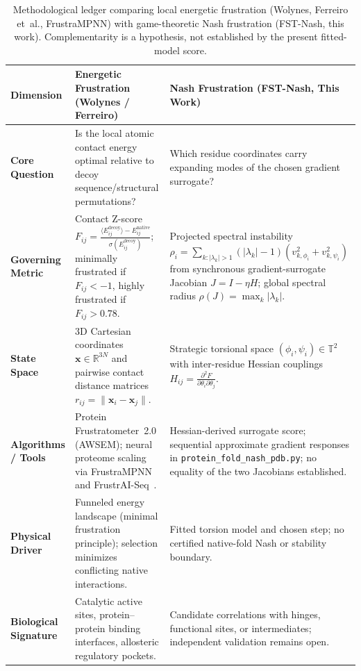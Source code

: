 \documentclass[12pt,a4paper]{article}
\theoremstyle{remark}
\begin{document}
\begin{table}[htbp]
\centering
\caption{Methodological ledger comparing local energetic frustration (Wolynes, Ferreiro et~al., FrustraMPNN) with game-theoretic Nash frustration (FST-Nash, this work). Complementarity is a hypothesis, not established by the present fitted-model score.}
\label{tab:frustration-comparison}
\small
\begin{tabularx}{\textwidth}{@{}L{0.20\textwidth} L{0.37\textwidth} Y@{}}
\toprule
\textbf{Dimension} & \textbf{Energetic Frustration (Wolynes / Ferreiro)} & \textbf{Nash Frustration (FST-Nash, This Work)} \\
\midrule
\textbf{Core Question} & Is the local atomic contact energy optimal relative to decoy sequence/structural permutations? & Which residue coordinates carry expanding modes of the chosen gradient surrogate? \\
\addlinespace
\textbf{Governing Metric} & Contact Z-score $F_{ij} = \frac{\langle E_{ij}^{\text{decoy}} \rangle - E_{ij}^{\text{native}}}{\sigma(E_{ij}^{\text{decoy}})}$; minimally frustrated if $F_{ij} < -1$, highly frustrated if $F_{ij} > 0.78$. & Projected spectral instability $\rho_i = \sum_{k: |\lambda_k|>1} (|\lambda_k|-1)(v_{k,\phi_i}^2 + v_{k,\psi_i}^2)$ from synchronous gradient-surrogate Jacobian $J = I - \eta H$; global spectral radius $\rho(J) = \max_k |\lambda_k|$. \\
\addlinespace
\textbf{State Space} & 3D Cartesian coordinates $\mathbf{x} \in \mathbb{R}^{3N}$ and pairwise contact distance matrices $r_{ij} = \|\mathbf{x}_i - \mathbf{x}_j\|$. & Strategic torsional space $(\phi_i, \psi_i) \in \mathbb{T}^2$ with inter-residue Hessian couplings $H_{ij} = \frac{\partial^2 F}{\partial \theta_i \partial \theta_j}$. \\
\addlinespace
\textbf{Algorithms / Tools} & Protein Frustratometer~2.0 (AWSEM); neural proteome scaling via FrustraMPNN and FrustrAI-Seq~\citep{Beining2026,Leusch2026}. & Hessian-derived surrogate score; sequential approximate gradient responses in \texttt{protein\_fold\_nash\_pdb.py}; no equality of the two Jacobians established. \\
\addlinespace
\textbf{Physical Driver} & Funneled energy landscape (minimal frustration principle); selection minimizes conflicting native interactions. & Fitted torsion model and chosen step; no certified native-fold Nash or stability boundary. \\
\addlinespace
\textbf{Biological Signature} & Catalytic active sites, protein--protein binding interfaces, allosteric regulatory pockets. & Candidate correlations with hinges, functional sites, or intermediates; independent validation remains open. \\

\end{tabularx}
\end{table}
\end{document}
